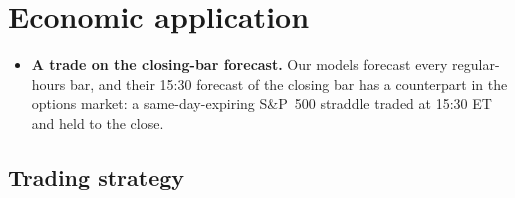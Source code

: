 

\section{Economic application}
\label{sec:rh_econ}
\begin{itemize}
\item \textbf{A trade on the closing-bar forecast.} Our models forecast every regular-hours bar, and their
  15:30 forecast of the closing bar has a counterpart in the options market: a same-day-expiring S\&P~500 straddle
  traded at 15:30 ET and held to the close.
\end{itemize}

\subsection{Trading strategy}
\label{sec:rh_econ_strategy}
